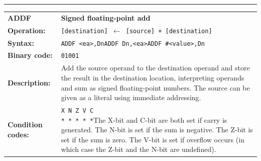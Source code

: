 \documentclass[]{article}
\begin{document}
\begin{appendices}
\noindent\rule{\textwidth}{1pt}\newline %
\setlength\extrarowheight{5pt} %
\begin{tabularx}{\textwidth}{lL}
  {\Large \textbf{ADDF}} 	& {\Large \textbf{Signed floating-point add}}\\
  \textbf{Operation:} 		& \texttt{[destination] $\leftarrow$ [source] + [destination]}\\
  \textbf{Syntax:}  		& \texttt{ADDF <ea>,Dn}\newline\texttt{ADDF Dn,<ea>}\newline\texttt{ADDF \#<value>,Dn}\\
  \textbf{Binary code:} 	& \texttt{01001}\\
  \textbf{Description:}  	& Add the source operand to the destination operand and store the
result in the destination location, interpreting operands and sum as signed floating-point numbers. The source can be given as a literal using immediate addressing.\\
  \textbf{Condition codes:} & \texttt{X N Z V C\newline * * * * *}\newline\newline The X-bit and C-bit are both set if carry is generated. The N-bit is set if the sum is negative. The Z-bit is set if the sum is zero. The V-bit is set if overflow occurs (in which case the Z-bit and the N-bit are undefined).\\
\end{tabularx}
\newline

\newpage


\end{appendices}
\end{document}
